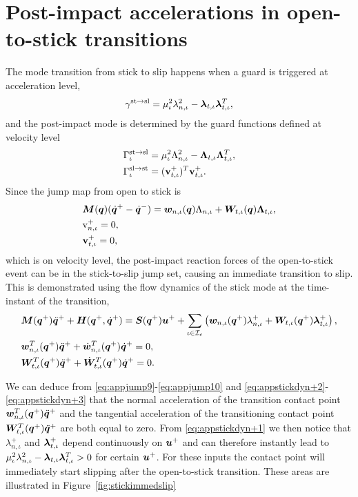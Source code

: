 \documentclass[../DC2019003Bouma.tex]{subfiles}
\begin{document}
\section{Post-impact accelerations in open-to-stick transitions}\label{app:instantslip}
The mode transition from stick to slip happens when a guard is triggered at acceleration level, 
\begin{align}
\gamma^{\text{st}\rightarrow\text{sl}} = \mu_{\iota}^2\lambda_{n,\iota}^2 - \boldsymbol{\lambda}_{t,\iota}\boldsymbol{\lambda}_{t,\iota}^T,
\end{align}
and the post-impact mode is determined by the guard functions defined at velocity level
\begin{align}
\Gamma^{\text{st}\rightarrow\text{sl}}_{\iota} &= \mu_{\iota}^2\Lambda_{n,\iota}^2 - \boldsymbol{\Lambda}_{t,\iota}\boldsymbol{\Lambda}_{t,\iota}^T,\\
\Gamma^{\text{sl}\rightarrow\text{st}}_{\iota} &= (\mathbf{v}^+_{t,\iota})^T\mathbf{v}^+_{t,\iota}.
\end{align}
Since the jump map from open to stick is
\begin{align}
&{\boldsymbol{M}}({\boldsymbol{q}})(\dot{{\boldsymbol{q}}}^+ - \dot{{\boldsymbol{q}}}^-) = {\boldsymbol{w}}_{n,\iota}({\boldsymbol{q}})\Lambda_{n,\iota} + {\boldsymbol{W}}_{t,\iota}({\boldsymbol{q}})\boldsymbol{\Lambda}_{t,\iota},\label{eq:appjump8}\\
&\mathrm{v}_{n,\iota}^+ = 0,\label{eq:appjump9}\\
&\mathbf{v}_{t,\iota}^+ = 0,\label{eq:appjump10}
\end{align}
which is on velocity level, the post-impact reaction forces of the open-to-stick event can be in the stick-to-slip jump set, causing an immediate transition to slip. This is demonstrated using the flow dynamics of the stick mode at the time-instant of the transition,
\begin{align}
&{\boldsymbol{M}}({\boldsymbol{q}}^+)\ddot{{\boldsymbol{q}}}^+ + {\boldsymbol{H}}({\boldsymbol{q}}^+,\dot{{\boldsymbol{q}}}^+) = {\boldsymbol{S}}({\boldsymbol{q}}^+){\boldsymbol{u}}^+ + \sum_{\iota\in\mathcal{I}_c}\left({\boldsymbol{w}}_{n,\iota}({\boldsymbol{q}}^+)\lambda^+_{n,\iota} + {\boldsymbol{W}}_{t,\iota}({\boldsymbol{q}}^+)\boldsymbol{\lambda}^+_{t,\iota} \right), \label{eq:appstickdyn+1}\\
&{\boldsymbol{w}}^T_{n,\iota}({\boldsymbol{q}}^+)\ddot{{\boldsymbol{q}}}^+ + \dot{{\boldsymbol{w}}}^T_{n,\iota}({\boldsymbol{q}}^+)\dot{{\boldsymbol{q}}}^+ = 0,\label{eq:appstickdyn+2}\\
&{\boldsymbol{W}}^T_{t,\iota}({\boldsymbol{q}}^+)\ddot{{\boldsymbol{q}}}^+ + \dot{{\boldsymbol{W}}}^T_{t,\iota}({\boldsymbol{q}}^+)\dot{{\boldsymbol{q}}}^+ = 0.\label{eq:appstickdyn+3}
\end{align}

We can deduce from \eqref{eq:appjump9}-\eqref{eq:appjump10} and \eqref{eq:appstickdyn+2}-\eqref{eq:appstickdyn+3} that the normal acceleration of the transition contact point ${\boldsymbol{w}}^T_{n,\iota}({\boldsymbol{q}}^+)\ddot{{\boldsymbol{q}}}^+$ and the tangential acceleration of the transitioning contact point ${\boldsymbol{W}}^T_{t,\iota}({\boldsymbol{q}}^+)\ddot{{\boldsymbol{q}}}^+$ are both equal to zero. From \eqref{eq:appstickdyn+1} we then notice that $\lambda_{n,\iota}^+$ and $\boldsymbol{\lambda}_{t,\iota}^+$ depend continuously on ${\boldsymbol{u}}^+$ and can therefore instantly lead to $\mu_{\iota}^2\lambda_{n,\iota}^2 - \boldsymbol{\lambda}_{t,\iota}\boldsymbol{\lambda}_{t,\iota}^T>0$ for certain ${\boldsymbol{u}}^+$. For these inputs the contact point will immediately start slipping after the open-to-stick transition. These areas are illustrated in Figure~\ref{fig:stickimmedslip}
\end{document}
